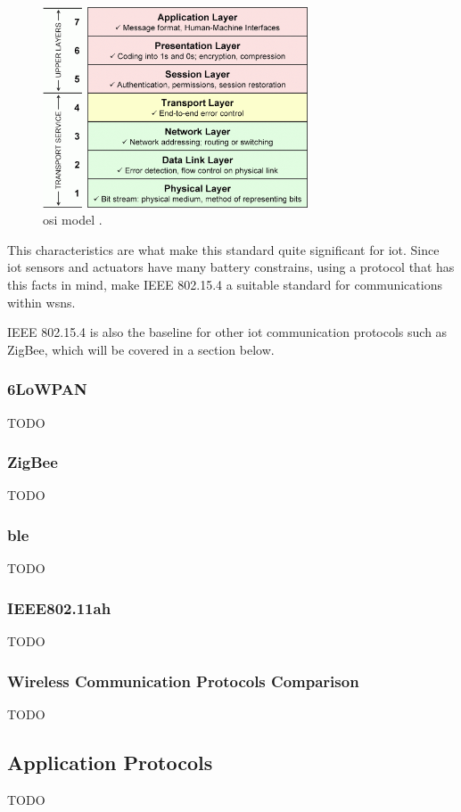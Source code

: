 \begin{figure}[H]
	\centering
	\includegraphics[width=0.7\textwidth]{figures/osi.png}
	\caption{\acf{osi} model \cite{Zikrillah}.}
	\label{fig:osi}
\end{figure}

This characteristics are what make this standard quite significant for \ac{iot}. Since \ac{iot} sensors and actuators have many battery constrains, using a protocol that has this facts in mind, make IEEE 802.15.4 a suitable standard for communications within \ac{wsn}s.

IEEE 802.15.4 is also the baseline for other \ac{iot} communication protocols such as ZigBee, which will be covered in a section below.


\subsubsection{6LoWPAN}
TODO
\subsubsection{ZigBee}
TODO
\subsubsection{\acf{ble}}
TODO
\subsubsection{IEEE802.11ah}
TODO
\subsubsection{Wireless Communication Protocols Comparison}
TODO
\subsection{Application Protocols}
TODO
